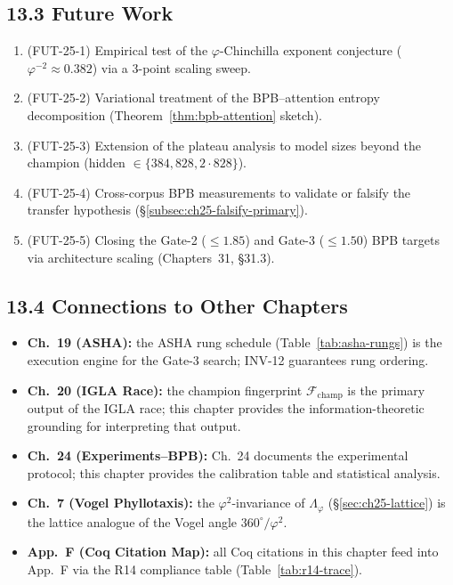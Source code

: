\subsection{13.3 Future Work}
\label{subsec:ch25-discussion-future}

\begin{enumerate}
  \item (FUT-25-1) Empirical test of the $\varphi$-Chinchilla exponent
    conjecture ($\varphi^{-2} \approx 0.382$) via a 3-point scaling sweep.
  \item (FUT-25-2) Variational treatment of the BPB–attention entropy
    decomposition (Theorem~\ref{thm:bpb-attention} sketch).
  \item (FUT-25-3) Extension of the plateau analysis to model sizes
    beyond the champion (hidden $\in \{384, 828, 2 \cdot 828\}$).
  \item (FUT-25-4) Cross-corpus BPB measurements to validate or
    falsify the transfer hypothesis (§\ref{subsec:ch25-falsify-primary}).
  \item (FUT-25-5) Closing the Gate-2 ($\le 1.85$) and Gate-3
    ($\le 1.50$) BPB targets via architecture scaling
    (Chapters~31, §31.3).
\end{enumerate}

\subsection{13.4 Connections to Other Chapters}
\label{subsec:ch25-discussion-connections}

\begin{itemize}
  \item \textbf{Ch.~19 (ASHA):} the ASHA rung schedule
    (Table~\ref{tab:asha-rungs}) is the execution engine for the
    Gate-3 search; INV-12 guarantees rung ordering.
  \item \textbf{Ch.~20 (IGLA Race):} the champion fingerprint
    $\mathcal{F}_{\mathrm{champ}}$ is the primary output of the IGLA
    race; this chapter provides the information-theoretic grounding
    for interpreting that output.
  \item \textbf{Ch.~24 (Experiments–BPB):} Ch.~24 documents the
    experimental protocol; this chapter provides the calibration
    table and statistical analysis.
  \item \textbf{Ch.~7 (Vogel Phyllotaxis):} the $\varphi^2$-invariance
    of $\Lambda_\varphi$ (§\ref{sec:ch25-lattice}) is the lattice
    analogue of the Vogel angle $360^\circ/\varphi^2$.
  \item \textbf{App.~F (Coq Citation Map):} all Coq citations in this
    chapter feed into App.~F via the R14 compliance table
    (Table~\ref{tab:r14-trace}).
\end{itemize}

